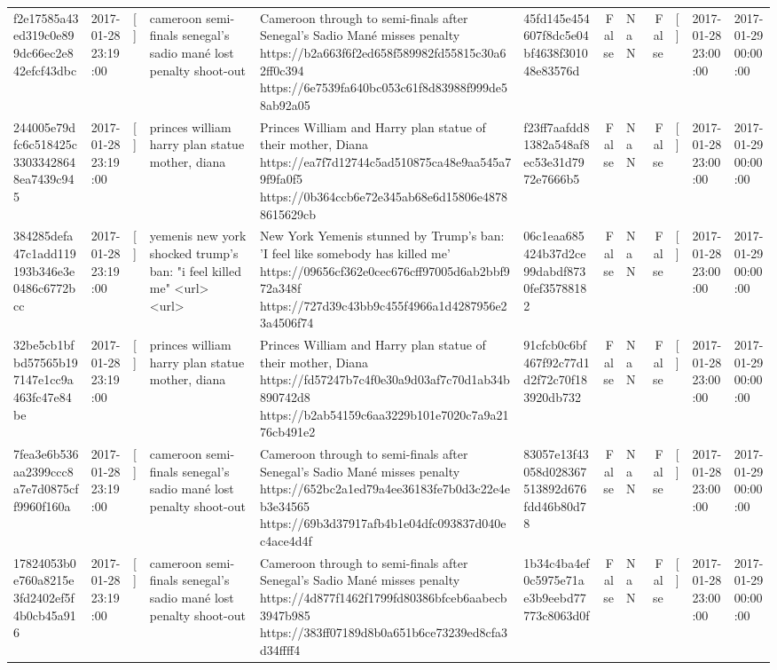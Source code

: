 \begin{tabular}{llllllrlrlll}
f2e17585a43ed319c0e899dc66ec2e842efcf43dbc & 2017-01-28 23:19:00 & [] & cameroon semi-finals senegal's sadio mané lost penalty shoot-out & Cameroon through to semi-finals after Senegal’s Sadio Mané misses penalty https://b2a663f6f2ed658f589982fd55815c30a62ff0c394 https://6e7539fa640bc053c61f8d83988f999de58ab92a05 & 45fd145e454607f8dc5e04bf4638f301048e83576d & False & NaN & False & [] & 2017-01-28 23:00:00 & 2017-01-29 00:00:00 \\
244005e79dfc6c518425c33033428648ea7439c945 & 2017-01-28 23:19:00 & [] & princes william harry plan statue mother, diana & Princes William and Harry plan statue of their mother, Diana https://ea7f7d12744c5ad510875ca48e9aa545a79f9fa0f5 https://0b364ccb6e72e345ab68e6d15806e48788615629cb & f23ff7aafdd81382a548af8ec53e31d7972e7666b5 & False & NaN & False & [] & 2017-01-28 23:00:00 & 2017-01-29 00:00:00 \\
384285defa47c1add119193b346e3e0486c6772bcc & 2017-01-28 23:19:00 & [] & yemenis new york shocked trump's ban: "i feel killed me" <url> <url> & New York Yemenis stunned by Trump's ban: 'I feel like somebody has killed me' https://09656cf362e0cec676cff97005d6ab2bbf972a348f https://727d39c43bb9c455f4966a1d4287956e23a4506f74 & 06c1eaa685424b37d2ce99dabdf8730fef35788182 & False & NaN & False & [] & 2017-01-28 23:00:00 & 2017-01-29 00:00:00 \\
32be5cb1bfbd57565b197147e1cc9a463fc47e84be & 2017-01-28 23:19:00 & [] & princes william harry plan statue mother, diana & Princes William and Harry plan statue of their mother, Diana https://fd57247b7c4f0e30a9d03af7c70d1ab34b890742d8 https://b2ab54159c6aa3229b101e7020c7a9a2176cb491e2 & 91cfcb0c6bf467f92c77d1d2f72c70f183920db732 & False & NaN & False & [] & 2017-01-28 23:00:00 & 2017-01-29 00:00:00 \\
7fea3e6b536aa2399ccc8a7e7d0875cff9960f160a & 2017-01-28 23:19:00 & [] & cameroon semi-finals senegal's sadio mané lost penalty shoot-out & Cameroon through to semi-finals after Senegal’s Sadio Mané misses penalty https://652bc2a1ed79a4ee36183fe7b0d3c22e4eb3e34565 https://69b3d37917afb4b1e04dfc093837d040ec4ace4d4f & 83057e13f43058d028367513892d676fdd46b80d78 & False & NaN & False & [] & 2017-01-28 23:00:00 & 2017-01-29 00:00:00 \\
17824053b0e760a8215e3fd2402ef5f4b0cb45a916 & 2017-01-28 23:19:00 & [] & cameroon semi-finals senegal's sadio mané lost penalty shoot-out & Cameroon through to semi-finals after Senegal’s Sadio Mané misses penalty https://4d877f1462f1799fd80386bfceb6aabecb3947b985 https://383ff07189d8b0a651b6ce73239ed8cfa3d34ffff4 & 1b34c4ba4ef0c5975e71ae3b9eebd77773c8063d0f & False & NaN & False & [] & 2017-01-28 23:00:00 & 2017-01-29 00:00:00 \\

\end{tabular}
